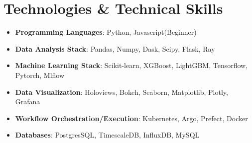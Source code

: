 \documentclass[letterpaper,11pt]{article}
\newcommand{\resumeItem}[2]{
  \item\small{
    \textbf{#1}{: #2 \vspace{-2pt}}
  }
}
\newcommand{\resumeSubItem}[2]{\resumeItem{#1}{#2}\vspace{-4pt}}
\newcommand{\resumeSubHeadingListStart}{\begin{itemize}[leftmargin=*]}
\newcommand{\resumeSubHeadingListEnd}{\end{itemize}}
\begin{document}
\section{Technologies \& Technical Skills}
  \resumeSubHeadingListStart
    \resumeSubItem{Programming Languages}{Python, Javascript(Beginner)}
    \resumeSubItem{Data Analysis Stack}{Pandas, Numpy, Dask, Scipy, Flask, Ray}
    \resumeSubItem{Machine Learning Stack}{Scikit-learn, XGBoost, LightGBM, Tensorflow, Pytorch, Mlflow}
    \resumeSubItem{Data Visualization}{Holoviews, Bokeh, Seaborn, Matplotlib, Plotly, Grafana}
    \resumeSubItem{Workflow Orchestration/Execution}{Kubernetes, Argo, Prefect, Docker}
    \resumeSubItem{Databases}{PostgresSQL, TimescaleDB, InfluxDB, MySQL}
  \resumeSubHeadingListEnd
\end{document}
